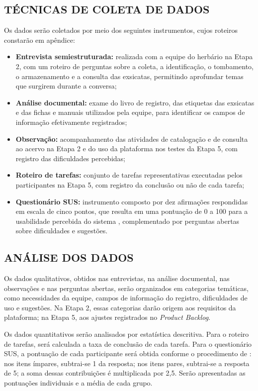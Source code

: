 \documentclass[
    12pt,        %
    openany,     %
    oneside,     %
    a4paper,     %
    english,     %
    french,      %
    spanish,     %
    brazil,      %
    article      %
]{abntex2}
\begin{document}
\subsection{TÉCNICAS DE COLETA DE DADOS}
\label{subsec:coleta-dados}

Os dados serão coletados por meio dos seguintes instrumentos, cujos roteiros constarão em apêndice:

\begin{itemize}
    \item \textbf{Entrevista semiestruturada:} realizada com a equipe do herbário na Etapa 2, com um roteiro de perguntas sobre a coleta, a identificação, o tombamento, o armazenamento e a consulta das exsicatas, permitindo aprofundar temas que surgirem durante a conversa;
    \item \textbf{Análise documental:} exame do livro de registro, das etiquetas das exsicatas e das fichas e manuais utilizados pela equipe, para identificar os campos de informação efetivamente registrados;
    \item \textbf{Observação:} acompanhamento das atividades de catalogação e de consulta ao acervo na Etapa 2 e do uso da plataforma nos testes da Etapa 5, com registro das dificuldades percebidas;
    \item \textbf{Roteiro de tarefas:} conjunto de tarefas representativas executadas pelos participantes na Etapa 5, com registro da conclusão ou não de cada tarefa;
    \item \textbf{Questionário SUS:} instrumento composto por dez afirmações respondidas em escala de cinco pontos, que resulta em uma pontuação de 0 a 100 para a usabilidade percebida do sistema \cite{brooke1996sus}, complementado por perguntas abertas sobre dificuldades e sugestões.
\end{itemize}

\subsection{ANÁLISE DOS DADOS}
\label{subsec:analise-dados}

Os dados qualitativos, obtidos nas entrevistas, na análise documental, nas observações e nas perguntas abertas, serão organizados em categorias temáticas, como necessidades da equipe, campos de informação do registro, dificuldades de uso e sugestões. Na Etapa 2, essas categorias darão origem aos requisitos da plataforma; na Etapa 5, aos ajustes registrados no \textit{Product Backlog}.

Os dados quantitativos serão analisados por estatística descritiva. Para o roteiro de tarefas, será calculada a taxa de conclusão de cada tarefa. Para o questionário SUS, a pontuação de cada participante será obtida conforme o procedimento de : nos itens ímpares, subtrai-se 1 da resposta; nos itens pares, subtrai-se a resposta de 5; a soma dessas contribuições é multiplicada por 2,5. Serão apresentadas as pontuações individuais e a média de cada grupo.
\end{document}
